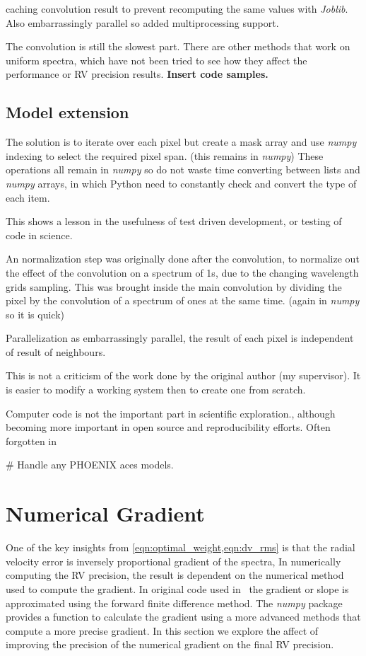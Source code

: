 caching convolution result to prevent recomputing the same values with \emph{Joblib}.
Also embarrassingly parallel so added multiprocessing support.

The convolution is still the slowest part.
There are other methods that work on uniform spectra, which have not been tried to see how they affect the performance or {RV} precision results.
\textbf{Insert code samples.}


\subsection{Model extension}
The solution is to iterate over each pixel but create a mask array and use \emph{numpy} indexing to select the required pixel span.
(this remains in \emph{numpy})
These operations all remain in \emph{numpy} so do not waste time converting between lists and \emph{numpy} arrays, in which Python need to constantly check and convert the type of each item.

This shows a lesson in the usefulness of test driven development, or testing of code in science.


An normalization step was originally done after the convolution, to normalize out the effect of the convolution on a spectrum of 1s, due to the changing wavelength grids sampling.
This was brought inside the main convolution by dividing the pixel by the convolution of a spectrum of ones at the same time.
 (again in \emph{numpy} so it is quick)

Parallelization as embarrassingly parallel, the result of each pixel is independent of result of neighbours.

This is not a criticism of the work done by the original author (my supervisor).
It is easier to modify a working system then to create one from scratch.

Computer code is not the important part in scientific exploration., although becoming more important in open source and reproducibility efforts.
Often forgotten in

\# Handle any {PHOENIX} aces models.


\section{Numerical Gradient}
\label{sec:numerical_gradient}
One of the key insights from \cref{eqn:optimal_weight,eqn:dv_rms} is that the radial velocity error is inversely proportional gradient of the spectra, In numerically computing the {RV} precision, the result is dependent on the numerical method used to compute the gradient.
In original code used in~\citet{figueira_radial_2016} the gradient or slope is approximated using the forward finite difference method.
The \emph{numpy} package provides a function to calculate the gradient using a more advanced methods that compute a more precise gradient.
In this section we explore the affect of improving the precision of the numerical gradient on the final {RV} precision.

